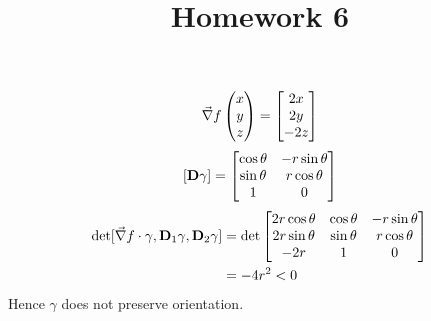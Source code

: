 \documentclass{homework}
\title{Homework 6}
\begin{document}
\maketitle

\begin{problem}{1}
  $$\vec{\nabla} f\begin{pmatrix}x \\ y \\ z\end{pmatrix} = \begin{bmatrix}2x \\ 2y \\ -2z\end{bmatrix}$$
  $$[\mathbf{D} \gamma] = \begin{bmatrix}
    \cos\theta & -r\sin\theta \\
    \sin\theta &  r\cos\theta \\
    1          &  0
  \end{bmatrix}$$
  \begin{align*}
    \det [\vec{\nabla} f \cdot \gamma, \mathbf{D}_1 \gamma, \mathbf{D}_2 \gamma]
    &= \det \begin{bmatrix}
      2r\cos\theta & \cos\theta & -r\sin\theta \\
      2r\sin\theta & \sin\theta &  r\cos\theta \\
      -2r          & 1          &  0
    \end{bmatrix} \\
    &= -4r^2 < 0
  \end{align*}
  Hence $\gamma$ does not preserve orientation.
\end{problem}
\end{document}
